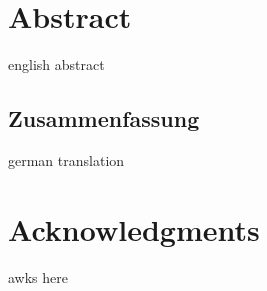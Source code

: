 \begingroup
\let\clearpage\relax
\let\cleardoublepage\relax
\let\cleardoublepage\relax
\chapter*{Abstract}
english abstract
\vfill

\newpage
\begin{otherlanguage}{ngerman}
\chapter*{Zusammenfassung}
german translation
\end{otherlanguage}


\newpage
\chapter*{Acknowledgments}
awks here
\endgroup

\vfill
